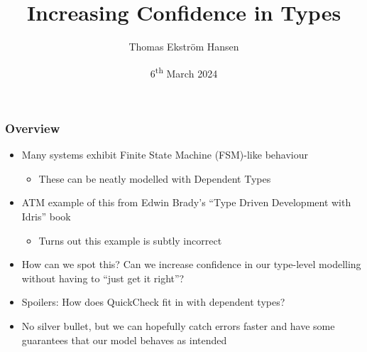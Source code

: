\documentclass[compress,handout]{beamer}
\title{Increasing Confidence in Types}
\author{Thomas Ekstr{\" o}m Hansen}
\date{6\textsuperscript{th} March 2024}
\begin{document}
\maketitle


\begin{frame}
  \frametitle{Overview}

  \begin{itemize}
    \item<1-> Many systems exhibit Finite State Machine (FSM)-like behaviour
    \begin{itemize}
      \item<1-> These can be neatly modelled with Dependent Types
    \end{itemize}
    \item<2-> ATM example of this from Edwin Brady's ``Type Driven
              Development with Idris'' book
    \begin{itemize}
      \item<2-> Turns out this example is subtly incorrect
    \end{itemize}
    \item<3-> How can we spot this? Can we increase confidence in our type-level
              modelling without having to ``just get it right''?
    \item<4-> Spoilers: How does QuickCheck fit in with dependent types?
    \item<5-> No silver bullet, but we can hopefully catch errors faster and
              have some guarantees that our model behaves as intended
  \end{itemize}

\end{frame}
\end{document}
